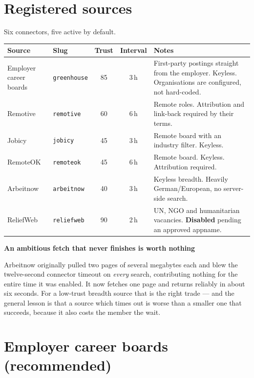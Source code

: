 \documentclass[11pt,a4paper]{report}
\newenvironment{callout}[1]
  {\begin{framed}\noindent\textbf{\textcolor{phcWarnInk}{#1}}\par\vspace{3pt}\small}
  {\end{framed}}
\newcommand{\dash}{---}
\begin{document}
\section{Registered sources}

Six connectors, five active by default.

\begin{center}
\begin{tabularx}{\textwidth}{@{}llccX@{}}
\toprule
\textbf{Source} & \textbf{Slug} & \textbf{Trust} & \textbf{Interval} &
\textbf{Notes} \\
\midrule
Employer career boards & \texttt{greenhouse} & 85 & 3\,h & First-party
postings straight from the employer. Keyless. Organisations are configured,
not hard-coded. \\
Remotive & \texttt{remotive} & 60 & 6\,h & Remote roles. Attribution and
link-back required by their terms. \\
Jobicy & \texttt{jobicy} & 45 & 3\,h & Remote board with an industry filter.
Keyless. \\
RemoteOK & \texttt{remoteok} & 45 & 6\,h & Remote board. Keyless. Attribution
required. \\
Arbeitnow & \texttt{arbeitnow} & 40 & 3\,h & Keyless breadth. Heavily
German/European, no server-side search. \\
ReliefWeb & \texttt{reliefweb} & 90 & 2\,h & UN, NGO and humanitarian
vacancies. \textbf{Disabled} pending an approved appname. \\
\bottomrule
\end{tabularx}
\end{center}

\begin{callout}{An ambitious fetch that never finishes is worth nothing}
Arbeitnow originally pulled two pages of several megabytes each and blew the
twelve-second connector timeout on \emph{every} search, contributing nothing
for the entire time it was enabled. It now fetches one page and returns
reliably in about six seconds. For a low-trust breadth source that is the
right trade \dash{} and the general lesson is that a source which times out is
worse than a smaller one that succeeds, because it also costs the member the
wait.
\end{callout}

\section{Employer career boards (recommended)}
\end{document}
